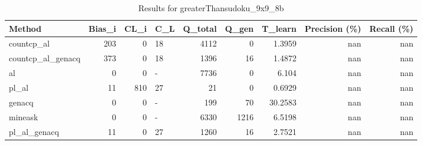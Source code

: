\begin{table}[ht]
\caption{Results for greaterThansudoku_9x9_8b}
\begin{tabular}{lrrlrrrrr}
\hline
 Method            &   Bias\_i &   CL\_i & C\_L   &   Q\_total &   Q\_gen &   T\_learn &   Precision (\%) &   Recall (\%) \\
\hline
 countcp\_al        &      203 &      0 & 18    &      4112 &       0 &    1.3959 &             nan &          nan \\
 countcp\_al\_genacq &      373 &      0 & 18    &      1396 &      16 &    1.4872 &             nan &          nan \\
 al                &        0 &      0 & -     &      7736 &       0 &    6.104  &             nan &          nan \\
 pl\_al             &       11 &    810 & 27    &        21 &       0 &    0.6929 &             nan &          nan \\
 genacq            &        0 &      0 & -     &       199 &      70 &   30.2583 &             nan &          nan \\
 mineask           &        0 &      0 & -     &      6330 &    1216 &    6.5198 &             nan &          nan \\
 pl\_al\_genacq      &       11 &      0 & 27    &      1260 &      16 &    2.7521 &             nan &          nan \\
\hline
\end{tabular}
\end{table}